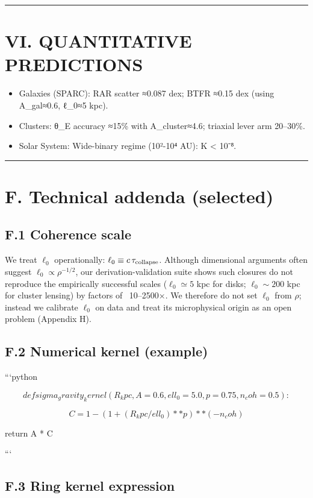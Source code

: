 \documentclass[11pt,a4paper]{article}
\begin{document}
\medskip\hrule\medskip


\section{VI. QUANTITATIVE PREDICTIONS}


\begin{itemize}
\item Galaxies (SPARC): RAR scatter ≈0.087 dex; BTFR ≈0.15 dex (using A\_gal≈0.6, ℓ\_0≈5 kpc).
\item Clusters: θ\_E accuracy ≈15\% with A\_cluster≈4.6; triaxial lever arm 20–30\%.
\item Solar System: Wide-binary regime (10²-10⁴ AU): K < 10⁻⁸.
\end{itemize}


\medskip\hrule\medskip


\section{F. Technical addenda (selected)}


\subsection{F.1 Coherence scale}


We treat $\ell_0$ operationally: $\ell_0 \equiv c\,\tau_{\rm collapse}$. Although dimensional arguments often suggest $\ell_0 \propto \rho^{-1/2}$, our derivation-validation suite shows such closures do not reproduce the empirically successful scales ($\ell_0 \simeq 5$ kpc for disks; $\ell_0 \sim 200$ kpc for cluster lensing) by factors of ~10–2500×. We therefore do not set $\ell_0$ from $\rho$; instead we calibrate $\ell_0$ on data and treat its microphysical origin as an open problem (Appendix H).


\subsection{F.2 Numerical kernel (example)}


```python

\[
def sigma_gravity_kernel(R_kpc, A=0.6, ell_0=5.0, p=0.75, n_coh=0.5):
\]

\[
C = 1 - (1 + (R_kpc/ell_0)**p)**(-n_coh)
\]

    return A * C

```


\subsection{F.3 Ring kernel expression}
\end{document}
